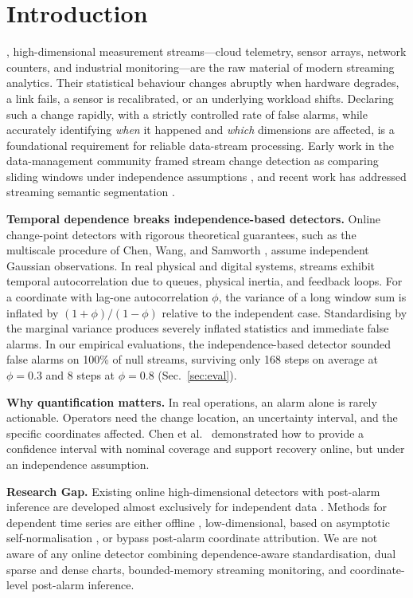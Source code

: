 \documentclass[lettersize,journal]{IEEEtran}
\begin{document}
\section{Introduction}
, high-dimensional measurement streams---cloud telemetry, sensor arrays, network counters, and industrial monitoring---are the raw material of modern streaming analytics. Their statistical behaviour changes abruptly when hardware degrades, a link fails, a sensor is recalibrated, or an underlying workload shifts. Declaring such a change rapidly, with a strictly controlled rate of false alarms, while accurately identifying \emph{when} it happened and \emph{which} dimensions are affected, is a foundational requirement for reliable data-stream processing. Early work in the data-management community framed stream change detection as comparing sliding windows under independence assumptions \cite{kifer2004detecting}, and recent work has addressed streaming semantic segmentation \cite{gharghabi2017domain}.

\textbf{Temporal dependence breaks independence-based detectors.} Online change-point detectors with rigorous theoretical guarantees, such as the multiscale procedure of Chen, Wang, and Samworth \cite{chen2020high,chen2024high}, assume independent Gaussian observations. In real physical and digital systems, streams exhibit temporal autocorrelation due to queues, physical inertia, and feedback loops. For a coordinate with lag-one autocorrelation $\phi$, the variance of a long window sum is inflated by $(1+\phi)/(1-\phi)$ relative to the independent case. Standardising by the marginal variance produces severely inflated statistics and immediate false alarms. In our empirical evaluations, the independence-based detector sounded false alarms on 100\% of null streams, surviving only 168 steps on average at $\phi=0.3$ and 8 steps at $\phi=0.8$ (Sec.~\ref{sec:eval}).

\textbf{Why quantification matters.} In real operations, an alarm alone is rarely actionable. Operators need the change location, an uncertainty interval, and the specific coordinates affected. Chen et al.~\cite{chen2024high} demonstrated how to provide a confidence interval with nominal coverage and support recovery online, but under an independence assumption.

\textbf{Research Gap.} Existing online high-dimensional detectors with post-alarm inference are developed almost exclusively for independent data \cite{chen2020high,chen2024high,shekhar2023nonparametric,kalinke2025streaming}. Methods for dependent time series are either offline \cite{wang2018high,cho2015multiple,madridpadilla2023nonparametric}, low-dimensional, based on asymptotic self-normalisation \cite{shao2010self}, or bypass post-alarm coordinate attribution. We are not aware of any online detector combining dependence-aware standardisation, dual sparse and dense charts, bounded-memory streaming monitoring, and coordinate-level post-alarm inference.
\end{document}
